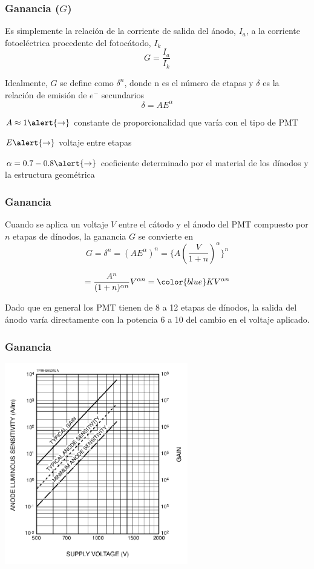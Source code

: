 \documentclass{beamer}
\begin{document}
\begin{frame}
\frametitle{Ganancia ($G$)}
\begin{exampleblock}{}
Es simplemente la relación de la corriente de salida del ánodo, $I_a$, a 
la corriente fotoeléctrica procedente del fotocátodo, $I_k$
$$G = \frac{I_a}{I_k}$$ 
\end{exampleblock}
Idealmente, $G$ se define como {\color{blue}$\delta^n$}, donde {\color{blue}n}
es el número de etapas y {\color{blue}$\delta$} es la relación de emisión de $e^-$ secundarios
$$\delta = AE^\alpha$$

$A \approx 1 \alert{\rightarrow}$ constante de proporcionalidad que varía con el tipo de PMT

$E \alert{\rightarrow}$ voltaje entre etapas

$\alpha = 0.7 - 0.8 \alert{\rightarrow}$ coeficiente determinado por el material de los
dínodos y la estructura geométrica
\end{frame} 

\begin{frame}
\frametitle{Ganancia}
Cuando se aplica un voltaje $V$ entre el cátodo y el ánodo del PMT compuesto por
$n$ etapas de dínodos, la ganancia $G$ se convierte en
$$G = \delta^n = \left(A E^\alpha \right)^n = \bigg\{A \left(\frac{V}{1 +
n}\right)^\alpha \bigg\}^n{}$$

$$ = \frac{A^n}{(1 + n)^{\alpha n}} V^{\alpha n} = {\color{blue}K V^{\alpha n}}$$

\begin{alertblock}{}
Dado que en general los PMT tienen de 8 a 12 etapas
de dínodos, la salida del ánodo varía directamente con la
potencia 6 a 10 del cambio en el voltaje aplicado.
\end{alertblock}
\end{frame} 

\begin{frame}
\frametitle{Ganancia}
\begin{center}
\includegraphics[height=0.8\textheight,width=0.6\textwidth]{d1/gain_R1463}
\end{center}
\end{frame}
\end{document}
